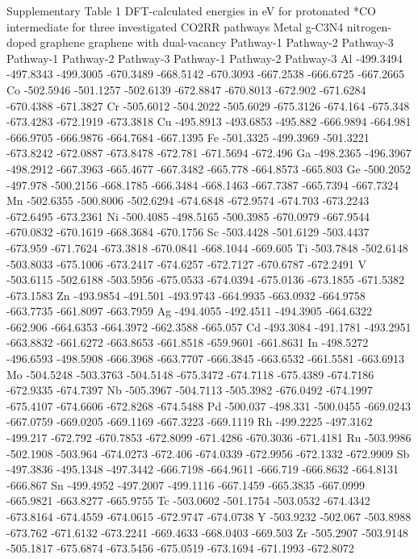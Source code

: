 Supplementary Table 1
DFT-calculated energies in eV for protonated *CO intermediate for three investigated CO2RR pathways
Metal	g-C3N4	nitrogen-doped graphene	graphene with dual-vacancy
	Pathway-1	Pathway-2	Pathway-3	Pathway-1	Pathway-2	Pathway-3	Pathway-1	Pathway-2	Pathway-3
Al	-499.3494	-497.8343	-499.3005	-670.3489	-668.5142	-670.3093	-667.2538	-666.6725	-667.2665
Co	-502.5946	-501.1257	-502.6139	-672.8847	-670.8013	-672.902	-671.6284	-670.4388	-671.3827
Cr	-505.6012	-504.2022	-505.6029	-675.3126	-674.164	-675.348	-673.4283	-672.1919	-673.3818
Cu	-495.8913	-493.6853	-495.882	-666.9894	-664.981	-666.9705	-666.9876	-664.7684	-667.1395
Fe	-501.3325	-499.3969	-501.3221	-673.8242	-672.0887	-673.8478	-672.781	-671.5694	-672.496
Ga	-498.2365	-496.3967	-498.2912	-667.3963	-665.4677	-667.3482	-665.778	-664.8573	-665.803
Ge	-500.2052	-497.978	-500.2156	-668.1785	-666.3484	-668.1463	-667.7387	-665.7394	-667.7324
Mn	-502.6355	-500.8006	-502.6294	-674.6848	-672.9574	-674.703	-673.2243	-672.6495	-673.2361
Ni	-500.4085	-498.5165	-500.3985	-670.0979	-667.9544	-670.0832	-670.1619	-668.3684	-670.1756
Sc	-503.4428	-501.6129	-503.4437	-673.959	-671.7624	-673.3818	-670.0841	-668.1044	-669.605
Ti	-503.7848	-502.6148	-503.8033	-675.1006	-673.2417	-674.6257	-672.7127	-670.6787	-672.2491
V	-503.6115	-502.6188	-503.5956	-675.0533	-674.0394	-675.0136	-673.1855	-671.5382	-673.1583
Zn	-493.9854	-491.501	-493.9743	-664.9935	-663.0932	-664.9758	-663.7735	-661.8097	-663.7959
Ag	-494.4055	-492.4511	-494.3905	-664.6322	-662.906	-664.6353	-664.3972	-662.3588	-665.057
Cd	-493.3084	-491.1781	-493.2951	-663.8832	-661.6272	-663.8653	-661.8518	-659.9601	-661.8631
In	-498.5272	-496.6593	-498.5908	-666.3968	-663.7707	-666.3845	-663.6532	-661.5581	-663.6913
Mo	-504.5248	-503.3763	-504.5148	-675.3472	-674.7118	-675.4389	-674.7186	-672.9335	-674.7397
Nb	-505.3967	-504.7113	-505.3982	-676.0492	-674.1997	-675.4107	-674.6606	-672.8268	-674.5488
Pd	-500.037	-498.331	-500.0455	-669.0243	-667.0759	-669.0205	-669.1169	-667.3223	-669.1119
Rh	-499.2225	-497.3162	-499.217	-672.792	-670.7853	-672.8099	-671.4286	-670.3036	-671.4181
Ru	-503.9986	-502.1908	-503.964	-674.0273	-672.406	-674.0339	-672.9956	-672.1332	-672.9909
Sb	-497.3836	-495.1348	-497.3442	-666.7198	-664.9611	-666.719	-666.8632	-664.8131	-666.867
Sn	-499.4952	-497.2007	-499.1116	-667.1459	-665.3835	-667.0999	-665.9821	-663.8277	-665.9755
Tc	-503.0602	-501.1754	-503.0532	-674.4342	-673.8164	-674.4559	-674.0615	-672.9747	-674.0738
Y	-503.9232	-502.067	-503.8988	-673.762	-671.6132	-673.2241	-669.4633	-668.0403	-669.503
Zr	-505.2907	-503.9148	-505.1817	-675.6874	-673.5456	-675.0519	-673.1694	-671.1993	-672.8072
